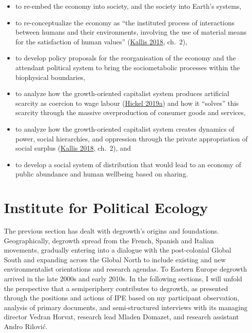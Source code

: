 \documentclass[a4paper, nobind]{templates/ociamthesis}
\providecommand{\tightlist}{%
  \setlength{\itemsep}{0pt}\setlength{\parskip}{0pt}}
\begin{document}
\begin{itemize}
\tightlist
\item
  to re-embed the economy into society, and the society into Earth's systems,
\item
  to re-conceptualize the economy as ``the instituted process of interactions between humans and their environments, involving the use of material means for the satisfaction of human values'' (\protect\hyperlink{ref-kallis_degrowth_2018}{Kallis 2018}, ch.~2),
\item
  to develop policy proposals for the reorganisation of the economy and the attendant political system to bring the sociometabolic processes within the biophysical boundaries,
\item
  to analyze how the growth-oriented capitalist system produces artificial scarcity as coercion to wage labour (\protect\hyperlink{ref-hickel_degrowth_2019}{Hickel 2019a}) and how it ``solves'' this scarcity through the massive overproduction of consumer goods and services,
\item
  to analyze how the growth-oriented capitalist system creates dynamics of power, social hierarchies, and oppression through the private appropriation of social surplus (\protect\hyperlink{ref-kallis_degrowth_2018}{Kallis 2018}, ch.~2), and
\item
  to develop a social system of distribution that would lead to an economy of public abundance and human wellbeing based on sharing.
\end{itemize}

\hypertarget{institute-for-political-ecology}{%
\section{Institute for Political Ecology}\label{institute-for-political-ecology}}

The previous section has dealt with degrowth's origins and foundations. Geographically, degrowth spread from the French, Spanish and Italian movements, gradually entering into a dialogue with the post-colonial Global South and expanding across the Global North to include existing and new environmentalist orientations and research agendas. To Eastern Europe degrowth arrived in the late 2000s and early 2010s. In the following sections, I will unfold the perspective that a semiperiphery contributes to degrowth, as presented through the positions and actions of IPE based on my participant observation, analysis of primary documents, and semi-structured interviews with its managing director Vedran Horvat, research lead Mladen Domazet, and research assistant Andro Rilović.
\end{document}
